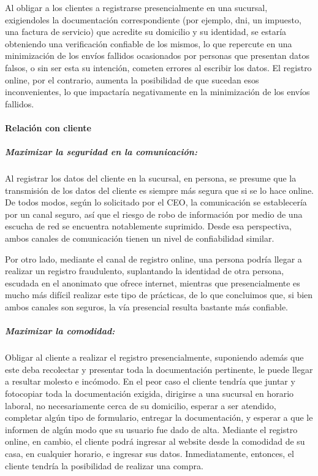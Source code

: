 Al obligar a los clientes a registrarse presencialmente en una sucursal,
exigiendoles la documentación correspondiente (por ejemplo, dni, un impuesto,
una factura de servicio) que acredite su domicilio y su identidad, se estaría
obteniendo una verificación confiable de los mismos, lo que repercute en una
minimización de los envíos fallidos ocasionados por personas que presentan datos
falsos, o sin ser esta su intención, cometen errores al escribir los datos. El
registro online, por el contrario, aumenta la posibilidad de que sucedan esos
inconvenientes, lo que impactaría negativamente en la minimización de los envíos
fallidos.

\paragraph{Relación con cliente}

\subparagraph{Maximizar la seguridad en la comunicación:}

Al registrar los datos del cliente en la sucursal, en persona, se presume que la
transmisión de los datos del cliente es siempre más segura que si se lo hace
online. De todos modos, según lo solicitado por el CEO, la comunicación se
establecería por un canal seguro, así que el riesgo de robo de información por
medio de una escucha de red se encuentra notablemente suprimido. Desde esa
perspectiva, ambos canales de comunicación tienen un nivel de confiabilidad
similar.

Por otro lado, mediante el canal de registro online, una persona podría llegar a
realizar un registro fraudulento, suplantando la identidad de otra persona,
escudada en el anonimato que ofrece internet, mientras que presencialmente es
mucho más difícil realizar este tipo de prácticas, de lo que concluimos que, si
bien ambos canales son seguros, la vía presencial resulta bastante más
confiable.

\subparagraph{Maximizar la comodidad:}

Obligar al cliente a realizar el registro presencialmente, suponiendo además que
este deba recolectar y presentar toda la documentación pertinente, le puede
llegar a resultar molesto e incómodo. En el peor caso el cliente tendría que
juntar y fotocopiar toda la documentación exigida, dirigirse a una sucursal en
horario laboral, no necesariamente cerca de su domicilio, esperar a ser
atendido, completar algún tipo de formulario, entregar la documentación, y
esperar a que le informen de algún modo que su usuario fue dado de alta.
Mediante el registro online, en cambio, el cliente podrá ingresar al website
desde la comodidad de su casa, en cualquier horario, e ingresar sus datos.
Inmediatamente, entonces, el cliente tendría la posibilidad de realizar una
compra.

